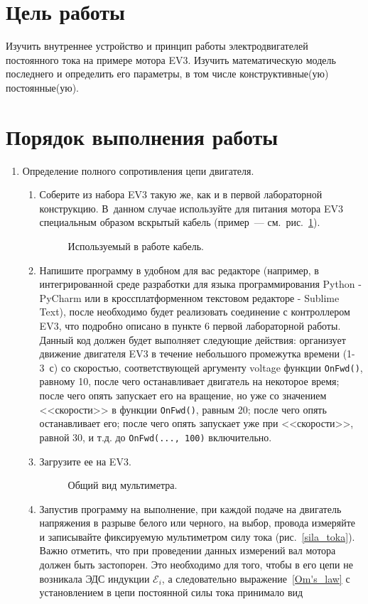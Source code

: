 \documentclass[12pt, a4paper, openany]{extarticle}
\begin{document}
\newpage
\section{Цель работы}
\hspace*{\parindent}Изучить внутреннее устройство и принцип работы электродвигателей постоянного тока на примере мотора EV3.
Изучить математическую модель последнего и определить его параметры, в том числе конструктивные(ую) постоянные(ую).
\section{Порядок выполнения работы}
\begin{enumerate}			
\item Определение полного сопротивления цепи двигателя.
\begin{enumerate}
\item Соберите из набора EV3 такую же, как и в первой лабораторной конструкцию. В~данном случае используйте для питания мотора EV3 специальным образом вскрытый кабель (пример~--- см.~рис.~\ref{wibe}).
\begin{figure}[h]
	\caption{Используемый в работе кабель.}
	\label{wibe}
\end{figure}
\item \label{prog}Напишите программу в удобном для вас редакторе (например, в интегрированной среде разработки для языка программирования Python - PyCharm или в кроссплатформенном текстовом редакторе - Sublime Text), после необходимо будет реализовать соединение с контроллером EV3, что подробно описано в пункте 6 первой лабораторной работы. Данный код должен будет выполняет следующие действия: организует движение двигателя EV3 в течение небольшого промежутка времени (1-3~с) со скоростью, соответствующей аргументу voltage функции \verb|OnFwd()|, равному 10, после чего останавливает двигатель на некоторое время; после чего опять запускает его на вращение, но уже со значением <<скорости>> в функции \verb|OnFwd()|, равным 20; после чего опять останавливает его; после чего опять запускает уже при <<скорости>>, равной 30, и т.д. до  \verb|OnFwd(..., 100)| включительно.
\item Загрузите ее на EV3.
\begin{figure}[h]
	\caption{Общий вид мультиметра.}
	\label{multimetr}
\end{figure} 
\item Запустив программу на выполнение, при каждой подаче на двигатель напряжения в разрыве белого или черного, на выбор, провода измеряйте и записывайте фиксируемую мультиметром силу тока (рис.~\ref{sila_toka}). Важно отметить, что при проведении данных измерений вал мотора должен быть застопорен. Это необходимо для того, чтобы в его цепи не возникала ЭДС индукции $\mathcal E_i$, а следовательно выражение~\eqref{Om's_law} с установлением в цепи постоянной силы тока принимало вид

\end{enumerate}
\end{enumerate}
\end{document}
